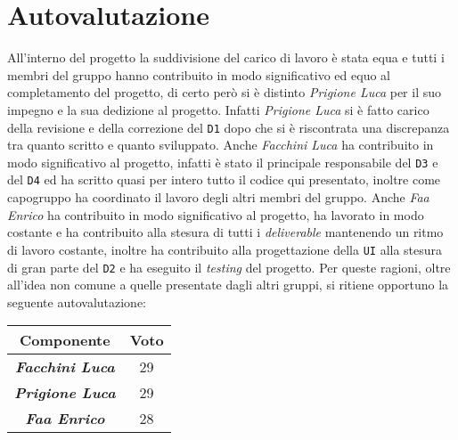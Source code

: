 \chapter{Autovalutazione}
All'interno del progetto la suddivisione del carico di lavoro è stata equa e tutti i membri del gruppo hanno contribuito in modo significativo ed equo al completamento del progetto, di certo però si è distinto \textit{Prigione Luca} per il suo impegno e la sua dedizione al progetto. Infatti \textit{Prigione Luca} si è fatto carico della revisione e della correzione del \texttt{D1} dopo che si è riscontrata una discrepanza tra quanto scritto e quanto sviluppato. Anche \textit{Facchini Luca} ha contribuito in modo significativo al progetto, infatti è stato il principale responsabile del \texttt{D3} e del \texttt{D4} ed ha scritto quasi per intero tutto il codice qui presentato, inoltre come capogruppo ha coordinato il lavoro degli altri membri del gruppo. Anche \textit{Faa Enrico} ha contribuito in modo significativo al progetto, ha lavorato in modo costante e ha contribuito alla stesura di tutti i \textit{deliverable} mantenendo un ritmo di lavoro costante, inoltre ha contribuito alla progettazione della \texttt{UI} alla stesura di gran parte del \texttt{D2} e ha eseguito il \textit{testing} del progetto. \newline
Per queste ragioni, oltre all'idea non comune a quelle presentate dagli altri gruppi, si ritiene opportuno la seguente autovalutazione:
    \begin{table}[H]
        \centering
        \begin{tabular}{|c|c|}
            \hline
            \textbf{Componente} & \textbf{Voto} \\
            \hline
            \textbf{\textit{Facchini Luca}} & 29 \\
            \hline
            \textbf{\textit{Prigione Luca}} & 29 \\
            \hline
            \textbf{\textit{Faa Enrico}} & 28 \\
            \hline
        \end{tabular}
    \end{table}